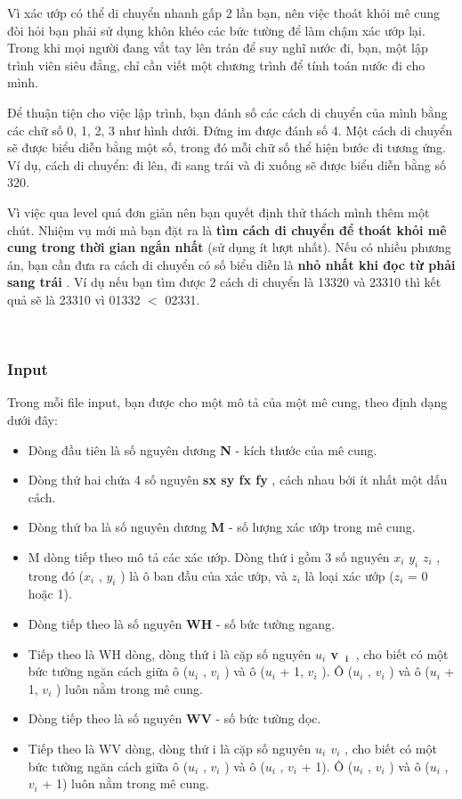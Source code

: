 Vì xác ướp có thể di chuyển nhanh gấp 2 lần bạn, nên việc thoát khỏi mê cung đòi hỏi bạn phải sử dụng khôn khéo các bức tường để làm chậm xác ướp lại. Trong khi mọi người đang vắt tay lên trán để suy nghĩ nước đi, bạn, một lập trình viên siêu đẳng, chỉ cần viết một chương trình để tính toán nước đi cho mình.

Để thuận tiện cho việc lập trình, bạn đánh số các cách di chuyển của mình bằng các chữ số 0, 1, 2, 3 như hình dưới. Đứng im được đánh số 4. Một cách di chuyển sẽ được biểu diễn bằng một số, trong đó mỗi chữ số thể hiện bước đi tương ứng. Ví dụ, cách di chuyển: đi lên, đi sang trái và đi xuống sẽ được biểu diễn bằng số 320.

Vì việc qua level quá đơn giản nên bạn quyết định thử thách mình thêm một chút. Nhiệm vụ mới mà bạn đặt ra là \textbf{ tìm cách di chuyển để thoát khỏi mê cung trong thời gian ngắn nhất } (sử dụng ít lượt nhất). Nếu có nhiều phương án, bạn cần đưa ra cách di chuyển có số biểu diễn là \textbf{ nhỏ nhất khi đọc từ phải sang trái } . Ví dụ nếu bạn tìm được 2 cách di chuyển là 13320 và 23310 thì kết quả sẽ là 23310 vì 01332 $<$ 02331.

 

\subsubsection{Input}

Trong mỗi file input, bạn được cho một mô tả của một mê cung, theo định dạng dưới đây:
\begin{itemize}
	\item Dòng đầu tiên là số nguyên dương \textbf{ N } - kích thước của mê cung.
	\item Dòng thứ hai chứa 4 số nguyên \textbf{ sx sy fx fy } , cách nhau bởi ít nhất một dấu cách.
	\item Dòng thứ ba là số nguyên dương \textbf{ M } - số lượng xác ướp trong mê cung.
	\item M dòng tiếp theo mô tả các xác ướp. Dòng thứ i gồm 3 số nguyên \textbf{ $x_{i}$}\textbf{ $y_{i}$}\textbf{ $z_{i}$} , trong đó ($x_{i}$ , $y_{i}$ ) là ô ban đầu của xác ướp, và $z_{i}$ là loại xác ướp ($z_{i}$ = 0 hoặc 1).
	\item Dòng tiếp theo là số nguyên \textbf{ WH } - số bức tường ngang.
	\item Tiếp theo là WH dòng, dòng thứ i là cặp số nguyên \textbf{ $u_{i}$ v }$_\textbf{ i }$ , cho biết có một bức tường ngăn cách giữa ô ($u_{i}$ , $v_{i}$ ) và ô ($u_{i}$ + 1, $v_{i}$ ). Ô ($u_{i}$ , $v_{i}$ ) và ô ($u_{i}$ + 1, $v_{i}$ ) luôn nằm trong mê cung.
	\item Dòng tiếp theo là số nguyên \textbf{ WV } - số bức tường dọc.
	\item Tiếp theo là WV dòng, dòng thứ i là cặp số nguyên \textbf{ $u_{i}$ $v_{i}$} , cho biết có một bức tường ngăn cách giữa ô ($u_{i}$ , $v_{i}$ ) và ô ($u_{i}$ , $v_{i}$ + 1). Ô ($u_{i}$ , $v_{i}$ ) và ô ($u_{i}$ , $v_{i}$ + 1) luôn nằm trong mê cung.
\end{itemize}

